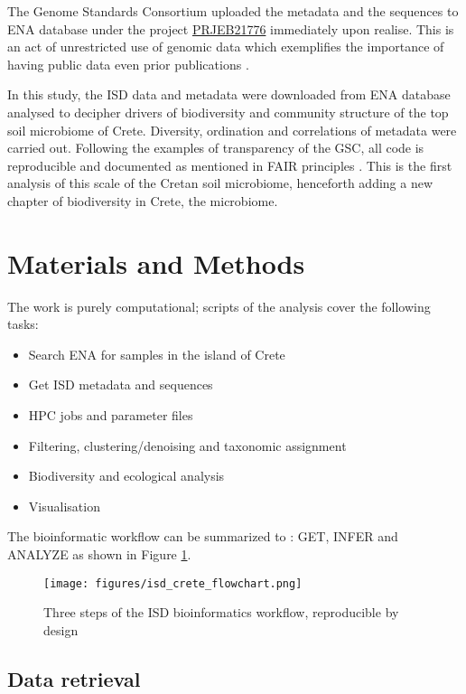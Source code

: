 The Genome Standards Consortium uploaded the metadata and the sequences to ENA
database under the project \href{https://www.ebi.ac.uk/ena/browser/view/PRJEB21776}{PRJEB21776} immediately upon realise. 
This is an act of unrestricted use of genomic data which exemplifies the importance of 
having public data even prior publications \parencite{kopf_2015}.

In this study, the ISD data and metadata were downloaded from ENA database analysed to decipher drivers of 
biodiversity and community structure of the top soil microbiome of Crete. Diversity, 
ordination and correlations of metadata were carried out. Following the examples of 
transparency of the GSC, all code is reproducible and documented as mentioned in FAIR principles \parencite{wilkinson2016the-fair}.
This is the first analysis 
of this scale of the Cretan soil microbiome, henceforth adding a new chapter of 
biodiversity in Crete, the microbiome.

\section{Materials and Methods}\label{isd_methods}

The work is purely computational; scripts of the analysis cover the following tasks:
\begin{itemize}
    \item Search ENA for samples in the island of Crete
    \item Get ISD metadata and sequences
    \item HPC jobs and parameter files
    \item Filtering, clustering/denoising and taxonomic assignment
    \item Biodiversity and ecological analysis 
    \item Visualisation
\end{itemize}

The bioinformatic workflow can be summarized to : GET, INFER and ANALYZE as shown in Figure \ref{fig:isd_workflow_taxonomy}.

\begin{figure}[h]
      \centering
      \texttt{[image: figures/isd\_crete\_flowchart.png]}
      \caption[Reproducible workflow of ISD analysis]{Three steps of the ISD bioinformatics workflow, reproducible by design}
      \label{fig:isd_workflow_taxonomy}
   \end{figure}
   
\subsection{Data retrieval}\label{isd_get}

